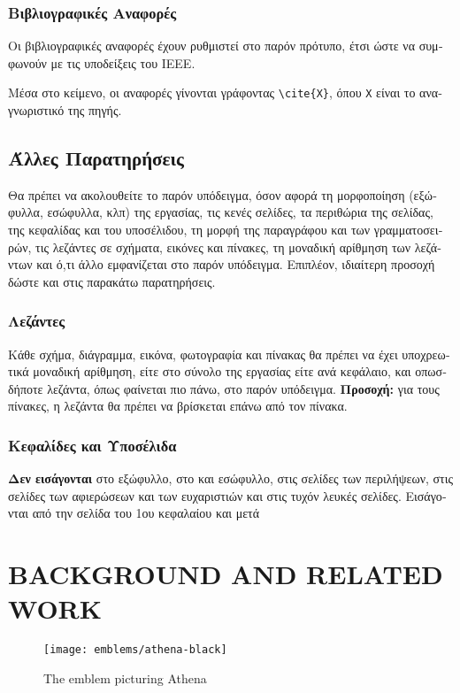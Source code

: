 \documentclass[inscr,ack,preface]{dithesis}
\begin{document}
\begin{greek}
    \subsection{Βιβλιογραφικές Αναφορές}
    Οι βιβλιογραφικές αναφορές έχουν ρυθμιστεί στο παρόν πρότυπο, έτσι ώστε να συμφωνούν με τις υποδείξεις του IEEE.

    Μέσα στο κείμενο, οι αναφορές γίνονται γράφοντας \verb!\cite{X}!, όπου \texttt{X} είναι το αναγνωριστικό της πηγής.

    \section{Άλλες Παρατηρήσεις}
    Θα πρέπει να ακολουθείτε το παρόν υπόδειγμα, όσον αφορά τη μορφοποίηση (εξώφυλλα, εσώφυλλα, κλπ) της εργασίας, τις κενές σελίδες, τα περιθώρια της σελίδας, της κεφαλίδας και του υποσέλιδου, τη μορφή της παραγράφου και των γραμματοσειρών, τις λεζάντες σε σχήματα, εικόνες και πίνακες, τη μοναδική αρίθμηση των λεζάντων και ό,τι άλλο εμφανίζεται στο παρόν υπόδειγμα. Επιπλέον, ιδιαίτερη προσοχή δώστε και στις παρακάτω παρατηρήσεις.

    \subsection{Λεζάντες}
    Κάθε σχήμα, διάγραμμα, εικόνα, φωτογραφία και πίνακας θα πρέπει να έχει υποχρεωτικά μοναδική αρίθμηση, είτε στο σύνολο της εργασίας είτε ανά κεφάλαιο, και οπωσδήποτε λεζάντα, όπως φαίνεται πιο πάνω, στο παρόν υπόδειγμα. \textbf{Προσοχή:} για τους πίνακες, η λεζάντα θα πρέπει να βρίσκεται επάνω από τον πίνακα.

    \subsection{Κεφαλίδες και Υποσέλιδα}
    \textbf{Δεν εισάγονται} στο εξώφυλλο, στο  και  εσώφυλλο, στις σελίδες των περιλήψεων, στις σελίδες των αφιερώσεων και των ευχαριστιών και στις τυχόν λευκές σελίδες. Εισάγονται από την  σελίδα του 1ου κεφαλαίου και μετά

  \end{greek}


\chapter{BACKGROUND AND RELATED WORK}
  \lipsum[4-7]
  \begin{figure}
    \centering
    \texttt{[image: emblems/athena-black]}
    \caption{The emblem picturing Athena}
    \label{athena}
  \end{figure}
\end{document}
